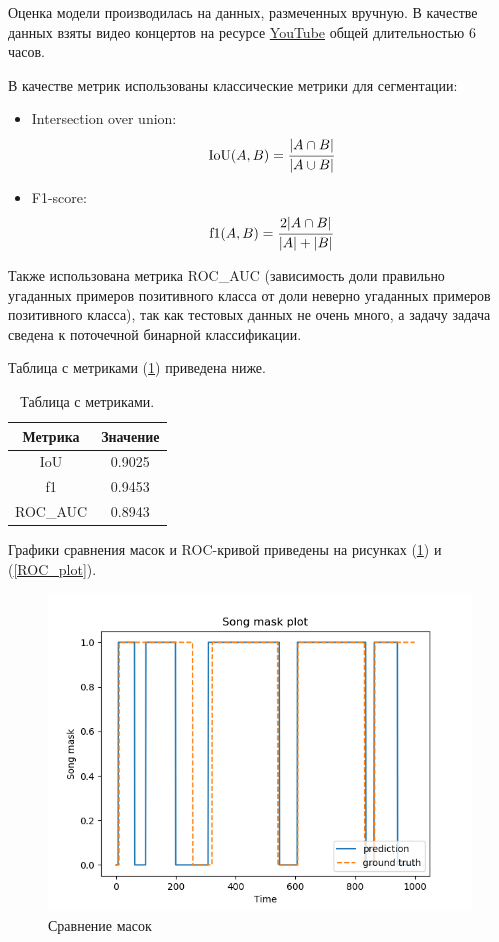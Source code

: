 \documentclass[../body.tex]{subfiles}
\begin{document}
\label{MetricsSection}
Оценка модели производилась на данных, размеченных вручную. В качестве данных взяты видео концертов на ресурсе \href{https://www.youtube.com/}{YouTube} общей длительностью 6 часов.

В качестве метрик использованы классические метрики для сегментации:

\begin{itemize}
	\item Intersection over union:
	\begin{equation}
		\text{IoU}(A, B) = \cfrac{|A \cap B|}{|A \cup B|}
	\end{equation}
	\item F1-score:
	\begin{equation}
		\text{f1}(A, B) = \cfrac{2|A \cap B|}{|A| + |B|}
	\end{equation}
\end{itemize}

Также использована метрика ROC\_AUC (зависимость доли правильно угаданных примеров позитивного класса от доли неверно угаданных примеров позитивного класса), так как тестовых данных не очень много, а задачу задача сведена к поточечной бинарной классификации.

Таблица с метриками (\ref{MetricsTable}) приведена ниже.

\begin{table}[H]
	\centering
	\begin{tabular}{|c|c|}
		\hline Метрика & Значение \\
		\hline
		IoU & 0.9025\\
		\hline
		f1 & 0.9453 \\
		\hline 
		ROC\_AUC & 0.8943\\
		\hline
	\end{tabular}
	\caption{Таблица с метриками.}\label{MetricsTable}
\end{table}

Графики сравнения масок и ROC-кривой приведены на рисунках (\ref{Mask_plot}) и (\ref{ROC_plot}).


\begin{figure}[H]
	\centering
	\includegraphics[scale=0.7]{images/masks.png}
	\caption{Сравнение масок}\label{Mask_plot}
\end{figure}
\end{document}

